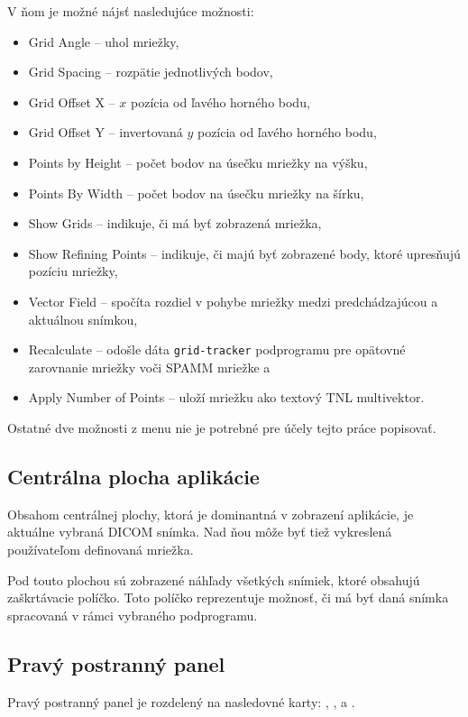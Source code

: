 {V ňom je možné nájsť nasledujúce možnosti:
\begin {itemize}
\item {Grid Angle -- uhol mriežky,}
\item {Grid Spacing -- rozpätie jednotlivých bodov,}
\item {Grid Offset X -- $x$ pozícia od ľavého horného bodu,}
\item {Grid Offset Y -- invertovaná $y$ pozícia od ľavého horného bodu,}
\item {Points by Height -- počet bodov na úsečku mriežky na výšku,}
\item {Points By Width -- počet bodov na úsečku mriežky na šírku,}
\item {Show Grids -- indikuje, či má byť zobrazená mriežka,}
\item {Show Refining Points -- indikuje, či majú byť zobrazené body, ktoré upresňujú pozíciu mriežky,}
\item {Vector Field -- spočíta rozdiel v pohybe mriežky medzi predchádzajúcou a aktuálnou snímkou,}
\item {Recalculate -- odošle dáta \texttt{grid-tracker} podprogramu pre opätovné zarovnanie mriežky voči SPAMM mriežke a}
\item {Apply Number of Points -- uloží mriežku ako textový TNL multivektor.}
\end {itemize}

Ostatné dve možnosti z menu  nie je potrebné pre účely tejto práce popisovať.

\clearpage

\subsection {Centrálna plocha aplikácie}
Obsahom centrálnej plochy, ktorá je dominantná v zobrazení aplikácie, je aktuálne vybraná DICOM snímka. Nad ňou môže byť tiež vykreslená používateľom definovaná mriežka.

Pod touto plochou sú zobrazené náhľady všetkých snímiek, ktoré obsahujú zaškrtávacie políčko. Toto políčko reprezentuje možnosť, či má byť daná snímka spracovaná v rámci vybraného podprogramu.

\subsection {Pravý postranný panel}
Pravý postranný panel je rozdelený na nasledovné karty: , ,  a .

}
